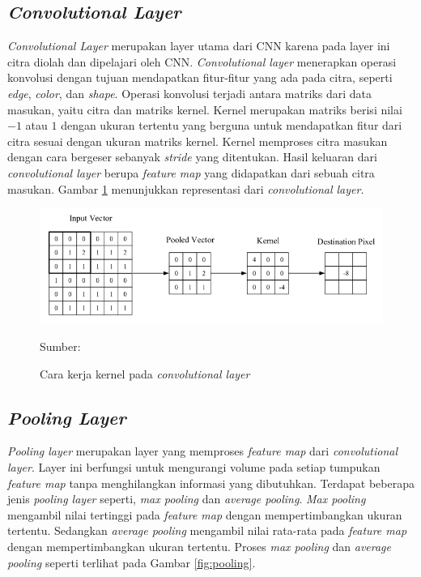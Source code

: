     \subsection{\textit{Convolutional Layer}}
    \textit{Convolutional Layer} merupakan layer utama dari CNN karena pada layer ini citra diolah dan dipelajari oleh CNN. \textit{Convolutional layer} menerapkan operasi konvolusi dengan tujuan mendapatkan fitur-fitur yang ada pada citra, seperti \textit{edge}, \textit{color}, dan \textit{shape}. Operasi konvolusi terjadi antara matriks dari data masukan, yaitu citra dan matriks kernel. Kernel merupakan matriks berisi nilai $-1$ atau $1$ dengan ukuran tertentu yang berguna untuk mendapatkan fitur dari citra sesuai dengan ukuran matriks kernel. Kernel memproses citra masukan dengan cara bergeser sebanyak \textit{stride} yang ditentukan. Hasil keluaran dari \textit{convolutional layer} berupa \textit{feature map} yang didapatkan dari sebuah citra masukan. Gambar \ref{fig:conv} menunjukkan representasi dari \textit{convolutional layer}.

    \begin{figure}[H]
        \begin{center}
            \includegraphics[width=12cm]{../img/CNN Convolutional Layer - Latex.png}
            \caption{Cara kerja kernel pada \textit{convolutional layer}}
            \label{fig:conv}
            Sumber: \citep{OShea2015}
        \end{center}
    \end{figure}

    \subsection{\textit{Pooling Layer}}
    \textit{Pooling layer} merupakan layer yang memproses \textit{feature map} dari \textit{convolutional layer}. Layer ini berfungsi untuk mengurangi volume pada setiap tumpukan \textit{feature map} tanpa menghilangkan informasi yang dibutuhkan. Terdapat beberapa jenis \textit{pooling layer} seperti, \textit{max pooling} dan \textit{average pooling}. \textit{Max pooling} mengambil nilai tertinggi pada \textit{feature map} dengan mempertimbangkan ukuran tertentu. Sedangkan \textit{average pooling} mengambil nilai rata-rata pada \textit{feature map} dengan mempertimbangkan ukuran tertentu. Proses \textit{max pooling} dan \textit{average pooling} seperti terlihat pada Gambar \ref{fig:pooling}.

